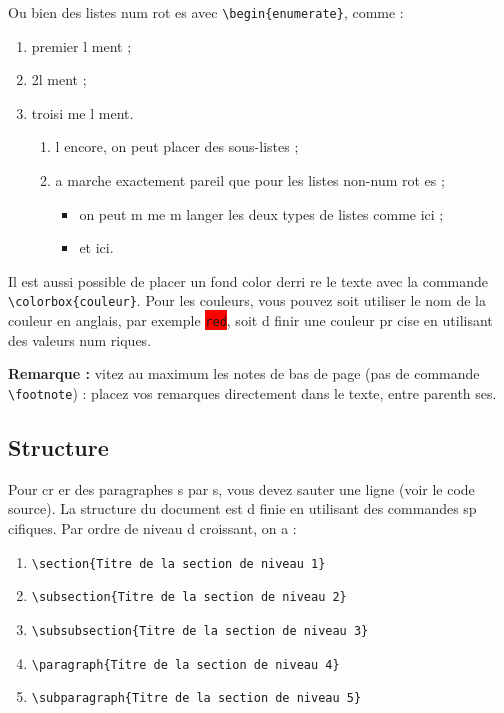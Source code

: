 \documentclass{article}
\begin{document}
Ou bien des listes num rot es avec \texttt{\textbackslash{}begin\{enumerate\}}, comme :
\begin{enumerate}
	\item premier  l ment ;
	\item 2\ieme  l ment ;
	\item troisi me  l ment.
	\begin{enumerate}
		\item l  encore, on peut placer des sous-listes ;
		\item  a marche exactement pareil que pour les listes non-num rot es ;
		\begin{itemize}
			\item on peut m me m langer les deux types de listes comme ici ;
			\item et ici.
		\end{itemize}
	\end{enumerate}
\end{enumerate}
	
Il est aussi possible de placer un fond color  derri re le texte avec la commande \texttt{\textbackslash{}colorbox\{couleur\}}. Pour les couleurs, vous pouvez soit utiliser le nom de la couleur en anglais, par exemple \colorbox{red}{\texttt{red}}, soit d finir une couleur pr cise en utilisant des valeurs num riques.

\textbf{Remarque :}  vitez au maximum les notes de bas de page (pas de commande \texttt{\textbackslash{}footnote}) : placez vos remarques directement dans le texte, entre parenth ses.

\subsection{Structure}
\label{sec:structure}
Pour cr er des paragraphes s par s, vous devez sauter une ligne (voir le code source). La structure du document est d finie en utilisant des commandes sp cifiques. Par ordre de niveau d croissant, on a :
\begin{enumerate}
	\item \texttt{\textbackslash{}section\{Titre de la section de niveau 1\}}
	\item \texttt{\textbackslash{}subsection\{Titre de la section de niveau 2\}}
	\item \texttt{\textbackslash{}subsubsection\{Titre de la section de niveau 3\}}
	\item \texttt{\textbackslash{}paragraph\{Titre de la section de niveau 4\}}
	\item \texttt{\textbackslash{}subparagraph\{Titre de la section de niveau 5\}}
\end{enumerate}
\end{document}
